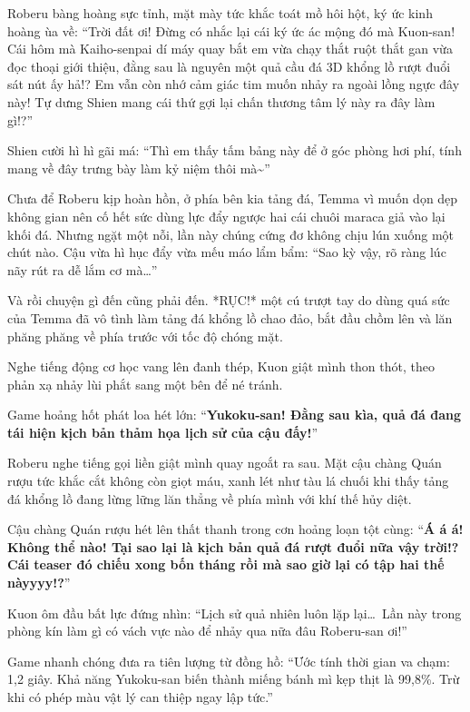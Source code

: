 \documentclass[../main.tex]{subfiles}
\begin{document}
Roberu bàng hoàng sực tỉnh, mặt mày tức khắc toát mồ hôi hột, ký ức kinh hoàng ùa về: ``Trời đất ơi! Đừng có nhắc lại cái ký ức ác mộng đó mà Kuon-san! Cái hôm mà Kaiho-senpai dí máy quay bắt em vừa chạy thắt ruột thắt gan vừa đọc thoại giới thiệu, đằng sau là nguyên một quả cầu đá 3D khổng lồ rượt đuổi sát nút ấy hả!? Em vẫn còn nhớ cảm giác tim muốn nhảy ra ngoài lồng ngực đây này! Tự dưng Shien mang cái thứ gợi lại chấn thương tâm lý này ra đây làm gì!?''

Shien cười hì hì gãi má: ``Thì em thấy tấm bảng này để ở góc phòng hơi phí, tính mang về đây trưng bày làm kỷ niệm thôi mà\~{}''

Chưa để Roberu kịp hoàn hồn, ở phía bên kia tảng đá, Temma vì muốn dọn dẹp không gian nên cố hết sức dùng lực đẩy ngược hai cái chuôi maraca giả vào lại khối đá. Nhưng ngặt một nỗi, lần này chúng cứng đơ không chịu lún xuống một chút nào. Cậu vừa hì hục đẩy vừa mếu máo lẩm bẩm: ``Sao kỳ vậy, rõ ràng lúc nãy rút ra dễ lắm cơ mà\dots''


Và rồi chuyện gì đến cũng phải đến. *RỤC!* một cú trượt tay do dùng quá sức của Temma đã vô tình làm tảng đá khổng lồ chao đảo, bắt đầu chồm lên và lăn phăng phăng về phía trước với tốc độ chóng mặt.

Nghe tiếng động cơ học vang lên đanh thép, Kuon giật mình thon thót, theo phản xạ nhảy lùi phắt sang một bên để né tránh.

Game hoảng hốt phát loa hét lớn: ``\textbf{Yukoku-san! Đằng sau kìa, quả đá đang tái hiện kịch bản thảm họa lịch sử của cậu đấy!}''

Roberu nghe tiếng gọi liền giật mình quay ngoắt ra sau. Mặt cậu chàng Quán rượu tức khắc cắt không còn giọt máu, xanh lét như tàu lá chuối khi thấy tảng đá khổng lồ đang lừng lững lăn thẳng về phía mình với khí thế hủy diệt.


Cậu chàng Quán rượu hét lên thất thanh trong cơn hoảng loạn tột cùng: ``\textbf{Á á á! Không thể nào! Tại sao lại là kịch bản quả đá rượt đuổi nữa vậy trời!? Cái teaser đó chiếu xong bốn tháng rồi mà sao giờ lại có tập hai thế nàyyyy!?}''

Kuon ôm đầu bất lực đứng nhìn: ``Lịch sử quả nhiên luôn lặp lại\dots\ Lần này trong phòng kín làm gì có vách vực nào để nhảy qua nữa đâu Roberu-san ơi!''

Game nhanh chóng đưa ra tiên lượng từ đồng hồ: ``Ước tính thời gian va chạm: 1,2 giây. Khả năng Yukoku-san biến thành miếng bánh mì kẹp thịt là 99,8\%. Trừ khi có phép màu vật lý can thiệp ngay lập tức.''
\end{document}
